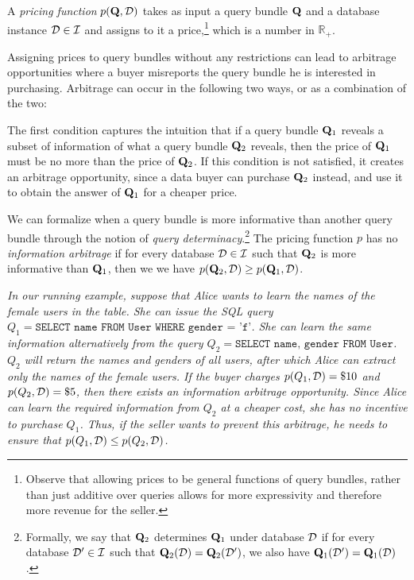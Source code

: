 A {\em pricing function} $p(\mathbf{Q}, \mathcal{D})$ takes as input a query bundle $\mathbf{Q}$ and a database instance $\mathcal{D} \in \mathcal{I}$ and assigns to it a price,\footnote{Observe that allowing prices to be general functions of query bundles, rather than just additive over queries allows for more expressivity and therefore more revenue for the seller.} which is a number in $ \mathbb{R}_+$. 

Assigning prices to query bundles without any restrictions can lead to arbitrage opportunities where a buyer misreports the query bundle he is interested in purchasing. Arbitrage can occur in the following two ways, or as a combination of the two:

 The first condition captures the intuition that if a query bundle $\mathbf{Q}_1$ reveals a subset of information of what a query bundle $\mathbf{Q}_2$ reveals, then the price of $\mathbf{Q}_1$ must be no more than the price of $\mathbf{Q}_2$. If this condition is not satisfied, it creates an arbitrage opportunity, since a data buyer can purchase $\mathbf{Q}_2$ instead, and use it to obtain the answer of $\mathbf{Q}_1$ for a cheaper price. 

We can formalize when a query bundle is more informative than another query bundle through the notion of {\em query determinacy}.\footnote{ Formally, we say that $\mathbf{Q}_2$ determines $\mathbf{Q}_1$ under database $\mathcal{D}$ if for every database $\mathcal{D}' \in \mathcal{I}$ such that $\mathbf{Q}_2(\mathcal{D}) = \mathbf{Q}_2(\mathcal{D}')$, we also have  $\mathbf{Q}_1(\mathcal{D}') = \mathbf{Q}_1(\mathcal{D})$.}
The pricing function $p$ has no {\em information arbitrage} if for every database $\mathcal{D} \in \mathcal{I}$ such that $\mathbf{Q}_2$ is more informative than $\mathbf{Q}_1$, then we 
we have $p(\mathbf{Q}_2, \mathcal{D}) \geq  p(\mathbf{Q}_1, \mathcal{D})$.

\begin{example}
\textit{In our running example, suppose that Alice wants to learn the names of the female users in the table. She can issue the SQL query $Q_1 = \texttt{SELECT name FROM User WHERE gender = 'f'}$. She can learn the same information alternatively from the query $Q_2 = \texttt{SELECT name, gender FROM User}$.
$Q_2$ will return the names and genders of all users, after which Alice can extract only the names of the female users.
%
If the buyer charges $p(Q_1,\mathcal{D}) = \$10$ and $p(Q_2,\mathcal{D}) = \$5$, then there exists an information arbitrage opportunity. Since Alice can learn the required information from $Q_2$ at a {\emph{cheaper}} cost, she has no incentive to purchase $Q_1$. Thus, if the seller wants to prevent this arbitrage, he needs to ensure that $p(Q_1,\mathcal{D}) \leq p(Q_2,\mathcal{D})$.}
\end{example}

